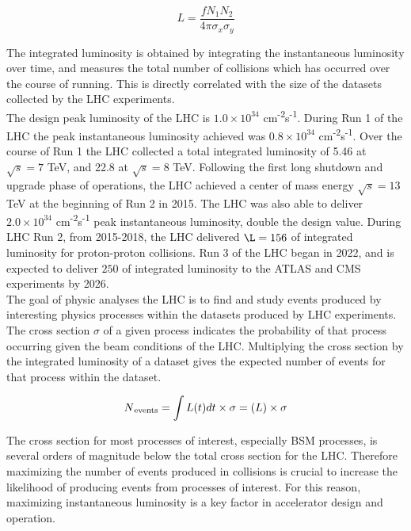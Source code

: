  \begin{equation}
	L = \frac{f N_1 N_2}{4 \pi \sigma_x \sigma_y}
	\label{eq:lumi}
\end{equation}
 
The integrated luminosity is obtained by integrating the instantaneous luminosity over time, and measures the total number of collisions which has occurred over the course of running. This is directly correlated with the size of the datasets collected by the LHC experiments.\\
 
 The design peak luminosity of the LHC is $1.0 \times 10^{34}$ cm\textsuperscript{-2}s\textsuperscript{-1}. During Run 1 of the LHC the peak instantaneous luminosity achieved was $0.8 \times 10^{34}$ cm\textsuperscript{-2}s\textsuperscript{-1}. Over the course of Run 1 the LHC collected a total integrated luminosity of  5.46 \invfb at $\sqrt{s} = 7$ TeV, and 22.8 \invfb at $\sqrt{s} = 8$ TeV. Following the first long shutdown and upgrade phase of operations, the LHC achieved a center of mass energy $\sqrt{s} = 13$ TeV at the beginning of Run 2 in 2015. The LHC was also able to deliver $2.0 \times 10^{34}$ cm\textsuperscript{-2}s\textsuperscript{-1} peak instantaneous luminosity, double the design value. During LHC Run 2, from 2015-2018, the LHC delivered $\L = 156$ \invfb of integrated luminosity for proton-proton collisions. Run 3 of the LHC began in 2022, and is expected to deliver $250$ \invfb of integrated luminosity to the ATLAS and CMS experiments by 2026.\\
 
The goal of physic analyses the LHC is to find and study events produced by interesting physics processes within the datasets produced by LHC experiments. The cross section $\sigma$ of a given process indicates the probability of that process occurring given the beam conditions of the LHC. Multiplying the cross section by the integrated luminosity of a dataset gives the expected number of events for that process within the dataset.

 \begin{equation}
	N\textsubscript{events} = \int L(t) dt \times \sigma = \mathcal(L) \times \sigma
	\label{eq:xs}
\end{equation}

The cross section for most processes of interest, especially BSM processes, is several orders of magnitude below the total cross section for the LHC. Therefore maximizing the number of events produced in collisions is crucial to increase the likelihood of producing events from processes of interest. For this reason, maximizing instantaneous luminosity is a key factor in accelerator design and operation.
